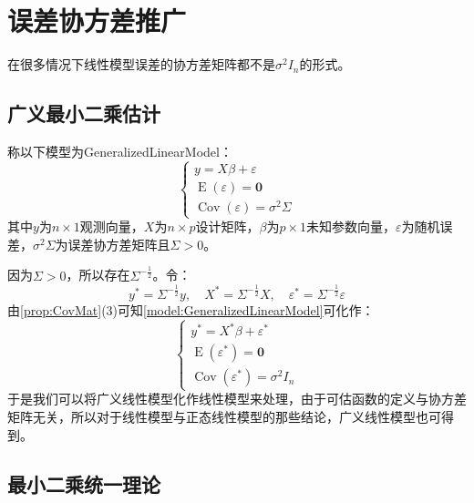 \section{误差协方差推广}
在很多情况下线性模型误差的协方差矩阵都不是$\sigma^2I_n$的形式。
\subsection{广义最小二乘估计}
\begin{definition}\label{model:GeneralizedLinearModel}
	称以下模型为\gls{GeneralizedLinearModel}：
	\begin{equation*}
		\begin{cases}
			y=X\beta+\varepsilon \\
			\operatorname{E}(\varepsilon)=\mathbf{0} \\
			\operatorname{Cov}(\varepsilon)=\sigma^2\Sigma
		\end{cases}
	\end{equation*}
	其中$y$为$n\times 1$观测向量，$X$为$n\times p$设计矩阵，$\beta$为$p\times 1$未知参数向量，$\varepsilon$为随机误差，$\sigma^2\Sigma$为误差协方差矩阵且$\Sigma>0$。
\end{definition}
\begin{derivation}
	因为$\Sigma>0$，所以存在$\Sigma^{-\frac{1}{2}}$。令：
	\begin{equation*}
		y^*=\Sigma^{-\frac{1}{2}}y,\quad X^*=\Sigma^{-\frac{1}{2}}X,\quad\varepsilon^*=\Sigma^{-\frac{1}{2}}\varepsilon
	\end{equation*}
	由\cref{prop:CovMat}(3)可知\cref{model:GeneralizedLinearModel}可化作：
	\begin{equation*}
		\begin{cases}
			y^*=X^*\beta+\varepsilon^* \\
			\operatorname{E}(\varepsilon^*)=\mathbf{0} \\
			\operatorname{Cov}(\varepsilon^*)=\sigma^2I_n
		\end{cases}
	\end{equation*}
	于是我们可以将广义线性模型化作线性模型来处理，由于可估函数的定义与协方差矩阵无关，所以对于线性模型与正态线性模型的那些结论，广义线性模型也可得到。
\end{derivation}

\subsection{最小二乘统一理论}